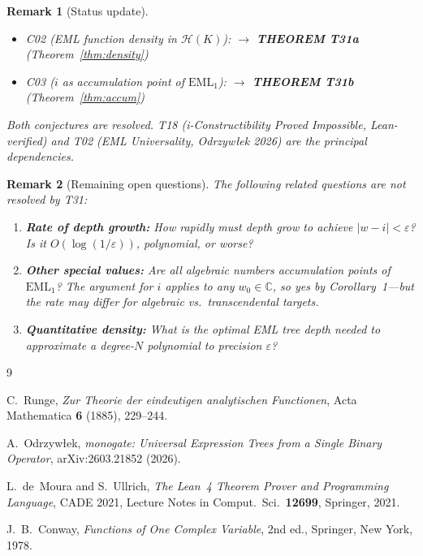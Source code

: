\documentclass[11pt]{article}
\newtheorem{remark}{Remark}
\begin{document}
\begin{remark}[Status update]
\leavevmode
\begin{itemize}
\item C02 (EML function density in $\mathcal{H}(K)$):
  $\longrightarrow$ \textbf{THEOREM T31a} (Theorem~\ref{thm:density})
\item C03 ($i$ as accumulation point of $\mathrm{EML}_1$):
  $\longrightarrow$ \textbf{THEOREM T31b} (Theorem~\ref{thm:accum})
\end{itemize}
Both conjectures are resolved.  T18 (i-Constructibility Proved Impossible,
Lean-verified) and T02 (EML Universality, Odrzyw\l{}ek 2026) are the principal
dependencies.
\end{remark}

\begin{remark}[Remaining open questions]
The following related questions are \emph{not} resolved by T31:
\begin{enumerate}
  \item \textbf{Rate of depth growth:} How rapidly must depth grow to achieve
    $|w - i| < \varepsilon$?  Is it $O(\log(1/\varepsilon))$, polynomial, or
    worse?
  \item \textbf{Other special values:} Are all algebraic numbers accumulation
    points of $\mathrm{EML}_1$?  The argument for $i$ applies to any $w_0 \in \mathbb{C}$,
    so yes by Corollary~1---but the rate may differ for algebraic vs.\ transcendental targets.
  \item \textbf{Quantitative density:} What is the optimal EML tree depth needed
    to approximate a degree-$N$ polynomial to precision $\varepsilon$?
\end{enumerate}
\end{remark}

\begin{thebibliography}{9}

C.~Runge,
\textit{Zur Theorie der eindeutigen analytischen Functionen},
Acta Mathematica \textbf{6} (1885), 229--244.

A.~Odrzyw\l{}ek,
\textit{monogate: Universal Expression Trees from a Single Binary Operator},
arXiv:2603.21852 (2026).

L.~de~Moura and S.~Ullrich,
\textit{The Lean~4 Theorem Prover and Programming Language},
CADE 2021, Lecture Notes in Comput.\ Sci.\ \textbf{12699}, Springer, 2021.

J.~B.~Conway,
\textit{Functions of One Complex Variable}, 2nd ed.,
Springer, New York, 1978.

\end{thebibliography}
\end{document}

